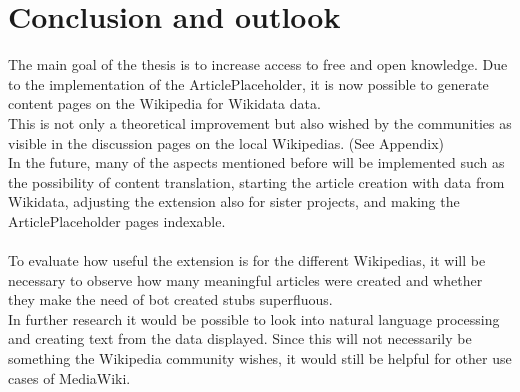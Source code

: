 \chapter{Conclusion and outlook}

The main goal of the thesis is to increase access to free and open knowledge. Due to the implementation of the ArticlePlaceholder, it is now possible to generate content pages on the Wikipedia for Wikidata data. \\
This is not only a theoretical improvement but also wished by the communities as visible in the discussion pages on the local Wikipedias. (See Appendix) \\
In the future, many of the aspects mentioned before will be implemented such as the possibility of content translation, starting the article creation with data from Wikidata, adjusting the extension also for sister projects, and making the ArticlePlaceholder pages indexable. \\
\\
To evaluate how useful the extension is for the different Wikipedias, it will be necessary to observe how many meaningful articles were created and whether they make the need of bot created stubs superfluous. \\
In further research it would be possible to look into natural language processing and creating text from the data displayed. Since this will not necessarily be something the Wikipedia community wishes, it would still be helpful for other use cases of MediaWiki. 
